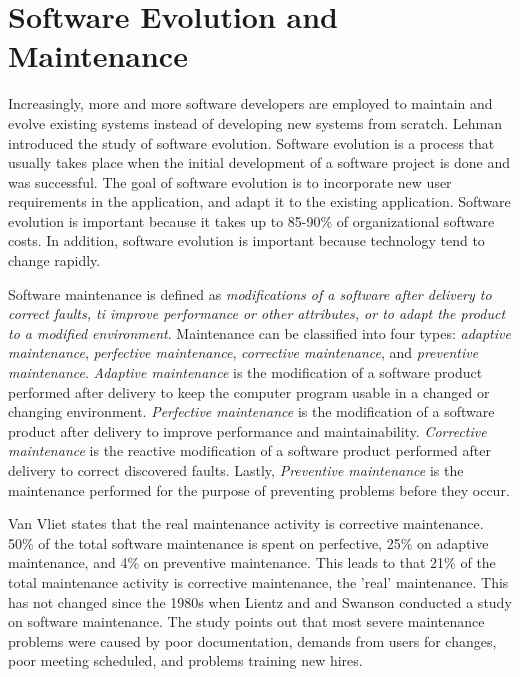 

\section{Software Evolution and Maintenance}
\label{sec:maintenance}
Increasingly, more and more software developers are employed to maintain and evolve existing systems instead of developing new systems from scratch\cite{Sommerville:2011:SE}. Lehman\cite{lehman1980programs} introduced the study of software evolution. Software evolution is a process that usually takes place when the initial development of a software project is done and was successful\cite{Bennett:2000:SME:336512.336534}. The goal of software evolution is to incorporate new user requirements in the application, and adapt it to the existing application. Software evolution is important because it takes up to 85-90\% of organizational software costs\cite{Sommerville:2011:SE}. In addition, software evolution is important because technology tend to change rapidly.

Software maintenance is defined as \textit{modifications of a software after delivery to correct faults, ti improve performance or other attributes, or to adapt the product to a modified environment}\cite{720567}. Maintenance can be classified into four types\cite{Bennett:2000:SME:336512.336534,720567}: \textit{adaptive maintenance}, \textit{perfective maintenance}, \textit{corrective maintenance}, and \textit{preventive maintenance}. \textit{Adaptive maintenance} is the modification of a software product performed after delivery to keep the computer program usable in a changed or changing environment. \textit{Perfective maintenance} is the modification of a software product after delivery to improve performance and maintainability. \textit{Corrective maintenance} is the reactive modification of a software product performed after delivery to correct discovered faults. Lastly, \textit{Preventive maintenance} is the maintenance performed for the purpose of preventing problems before they occur.

Van Vliet\cite{Vliet:2008:SEP:1481475} states that the real maintenance activity is corrective maintenance. 50\% of the total software maintenance is spent on perfective, 25\% on adaptive maintenance, and 4\% on preventive maintenance. This leads to that 21\% of the total maintenance activity is corrective maintenance, the 'real' maintenance\cite{Vliet:2008:SEP:1481475}. This has not changed since the 1980s when Lientz and and Swanson conducted a study on software maintenance\cite{lientz1980software}. The study points out that most severe maintenance problems were caused by poor documentation, demands from users for changes, poor meeting scheduled, and problems training new hires.



